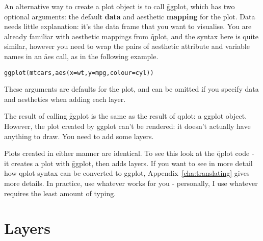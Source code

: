 
An alternative way to create a plot object is to call \f{ggplot}, which has two optional arguments: the default {\bf data} and aesthetic {\bf mapping} for the plot.  Data needs little explanation: it's the data frame that you want to visualise.  You are already familiar with aesthetic mappings from \f{qplot}, and the syntax here is quite similar, however you need to wrap the pairs of aesthetic attribute and variable names in an \f{aes} call, as in the following example.

\begin{alltt}
  ggplot(mtcars, aes(x = wt, y = mpg, colour = cyl))
\end{alltt}

These arguments are defaults for the plot, and can be omitted if you specify data and aesthetics when adding each layer.  

The result of calling \f{ggplot} is the same as the result of qplot: a ggplot object.  However, the plot created by ggplot can't be rendered: it doesn't actually have anything to draw.  You need to add some layers.

Plots created in either manner are identical.  To see this look at the \f{qplot} code - it creates a plot with \f{ggplot}, then adds layers.  If you want to see in more detail how qplot syntax can be converted to ggplot, Appendix~\ref{cha:translating} gives more details. In practice, use whatever works for you - personally, I use whatever requires the least amount of typing.

% 

\section{Layers}
\label{sec:layers}

